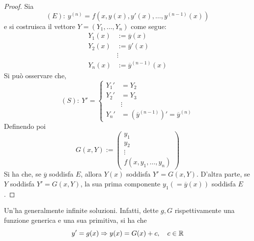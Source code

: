 \begin{proof}
    Sia
    \begin{equation*}
  (E):\ y^{(n)}=f\left(x, y(x), y'(x), \dots, y^{(n-1)}(x)\right)
    \end{equation*}
    e si costruisca il vettore $Y=(Y_1, \dots, Y_n)$ come segue: 
    \begin{equation*}
        \begin{aligned}
        Y_1(x)&:= \overline{y}(x)\\
        Y_2(x)&:= \overline{y}'(x)\\
            &\vdots\\
        Y_n(x)&:= \overline{y}^{(n-1)}(x)
        \end{aligned}
    \end{equation*}
    Si può osservare che,
    \begin{equation*}
      (S):\ Y'= \begin{cases}
            Y_1'&= Y_2\\
            Y_2'&=Y_3\\
            &\vdots\\
            Y_n'&= \left(\overline{y}^{(n-1)}\right)'=\overline{y}^{(n)}
        \end{cases}
    \end{equation*}
    Definendo poi
    \begin{equation*}
        G(x, Y) := \begin{pmatrix}
            y_1\\
            y_2\\
            \vdots\\
            f(x, y_1, \dots, y_n)
        \end{pmatrix}
    \end{equation*}
    Si ha che, se $\overline{y}$ soddisfa $E$, allora $Y(x)$
    soddisfa $Y'=G(x, Y)$. D'altra parte, se $Y$ soddisfa $Y'=G(x, Y)$, la sua prima componente $y_1(=\overline{y}(x))$ soddisfa $E$.
\end{proof}
\begin{oss}
Un'\ode ha generalmente infinite soluzioni. Infatti, dette $g, G$ rispettivamente una funzione generica e una sua primitiva, si ha che
\begin{equation*}
    y'= g(x) \Rightarrow y(x)= G(x)+c,\quad c \in \mathbb{R}
\end{equation*}
\end{oss}
